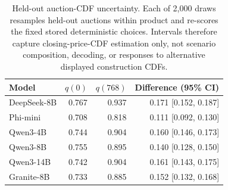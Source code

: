 \begin{table}[H]
\centering
\caption{Held-out auction-CDF uncertainty. Each of 2,000 draws resamples held-out auctions within product and re-scores the fixed stored deterministic choices. Intervals therefore capture closing-price-CDF estimation only, not scenario composition, decoding, or responses to alternative displayed construction CDFs.}
\label{tab:auctioncdf}
\small
\setlength{\tabcolsep}{4pt}
\begin{tabular}{lrrr}
\toprule
Model & $q(0)$ & $q(768)$ & Difference (95\% CI) \\
\midrule
DeepSeek-8B & 0.767 & 0.937 & 0.171 [0.152, 0.187] \\
Phi-mini & 0.708 & 0.818 & 0.111 [0.092, 0.130] \\
Qwen3-4B & 0.744 & 0.904 & 0.160 [0.146, 0.173] \\
Qwen3-8B & 0.755 & 0.895 & 0.140 [0.128, 0.150] \\
Qwen3-14B & 0.742 & 0.904 & 0.161 [0.143, 0.175] \\
Granite-8B & 0.733 & 0.885 & 0.152 [0.132, 0.168] \\
\bottomrule
\end{tabular}
\end{table}
